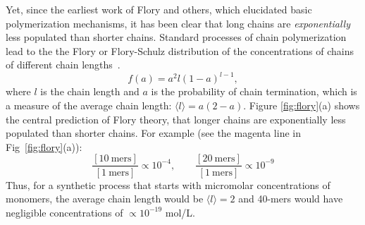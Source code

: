 \documentclass[5p,times]{elsarticle}
\newcommand*{\pq}[1]{\left[ #1 \right]}
\begin{document}
 Yet, since the earliest work of Flory and others, which elucidated basic polymerization mechanisms, 
it has been clear that long chains are \textit{exponentially} less populated than shorter chains.  
Standard 
processes of chain polymerization lead to the the Flory or Flory-Schulz distribution of the 
concentrations of chains of different chain 
lengths~\cite{Flory1953}. 
\begin{equation}
 f(a)=a^2l(1-a)^{l-1},\label{eq:flory}
\end{equation} 
where $l$ is the chain length and $a$ is the probability of chain termination, 
which is a measure of the average chain length: $\langle l \rangle = a(2- a)$.
Figure \ref{fig:flory}(a) shows the central prediction of Flory theory, that 
longer chains are exponentially less populated than shorter chains.  For example (see the magenta 
line 
in Fig~\ref{fig:flory}(a)):
\begin{equation}  
\frac{\pq{10~\mathrm{mers}}}{\pq{1~\mathrm{mers}}}\propto10^{-4},\qquad\frac{\pq{20~\mathrm{mers}}}
{
\pq{1~\mathrm{mers}}}\propto10^{-9}
\end{equation} 
Thus, for a synthetic process that starts with micromolar concentrations of monomers, the 
average chain length would be $\langle l \rangle = 2$ and 40-mers would have 
negligible concentrations of $\propto 10^{-19} $ mol/L. 
\end{document}
